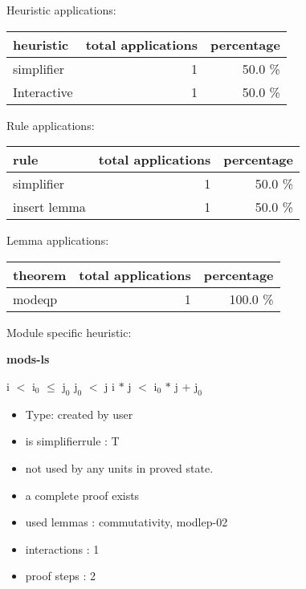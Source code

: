 \documentclass[a4paper]{article}
\begin{document}
\medskip


Heuristic applications:

\begin{supertabular}{l|r|r}
heuristic	& total applications & percentage \\ \hline
simplifier & 1 & 50.0 \% \\
Interactive & 1 & 50.0 \% \\

\end{supertabular}

Rule applications:

\begin{supertabular}{l|r|r}
rule	        & total applications & percentage \\ \hline
simplifier & 1 & 50.0 \% \\
insert lemma & 1 & 50.0 \% \\

\end{supertabular}

Lemma applications:

\begin{supertabular}{l|r|r}
theorem	        & total applications & percentage \\ \hline
modeqp & 1 & 100.0 \% \\

\end{supertabular}

Module specific heuristic:

\pagebreak

{\LARGE\bf mods-ls}\label{lemma-mods-ls}

\medskip

 \Fol i $<$ $\mbox{i}_{0}$  $\le$ $\mbox{j}_{0}$ \And $\mbox{j}_{0}$ $<$ j \Imp i $*$ j $<$ $\mbox{i}_{0}$ $*$ j + $\mbox{j}_{0}$

\begin{itemize}

\item Type: created by user

\item is simplifierrule : T
\item not used by any units in proved state.
\item       a complete proof exists
\item       used lemmas  : commutativity, modlep-02
\item       interactions : 1
\item       proof steps  : 2
\end{itemize}
\end{document}
